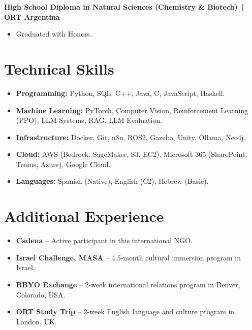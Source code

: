 \documentclass[a4paper,11pt]{article}
\begin{document}
\textbf{High School Diploma in Natural Sciences (Chemistry \& Biotech) \,|\, ORT Argentina}
\begin{itemize}
    \item Graduated with Honors.
\end{itemize}

\section*{Technical Skills}

\begin{itemize}
    \item \textbf{Programming:} Python, SQL, C++, Java, C, JavaScript, Haskell.
    \item \textbf{Machine Learning:} PyTorch, Computer Vision, Reinforcement Learning (PPO), LLM Systems, RAG, LLM Evaluation.
    \item \textbf{Infrastructure:} Docker, Git, n8n, ROS2, Gazebo, Unity, Ollama, Neo4j.
    \item \textbf{Cloud:} AWS (Bedrock, SageMaker, S3, EC2), Microsoft 365 (SharePoint, Teams, Azure), Google Cloud.
    \item \textbf{Languages:} Spanish (Native), English (C2), Hebrew (Basic).
\end{itemize}

\section*{Additional Experience}

\begin{itemize}
    \item \textbf{Cadena} -- Active participant in this international NGO.
    \item \textbf{Israel Challenge, MASA} -- 4.5-month cultural immersion program in Israel.
    \item \textbf{BBYO Exchange} -- 2-week international relations program in Denver, Colorado, USA.
    \item \textbf{ORT Study Trip} -- 2-week English language and culture program in London, UK.
\end{itemize}
\end{document}
